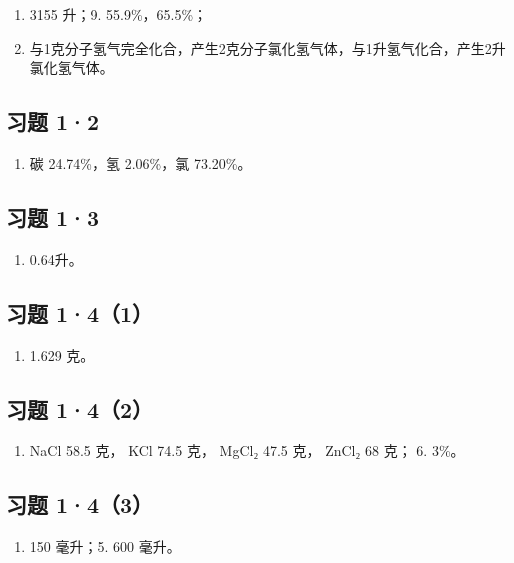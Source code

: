 \begin{enumerate}[start=8]
\item
  3155 升；9. 55.9\%，65.5\%；
\item
  与1克分子氢气完全化合，产生2克分子氯化氢气体，与1升氢气化合，产生2升氯化氢气体。
\end{enumerate}

\subsection{习题 1·2}

\begin{enumerate}[start=4]
\item
  碳 24.74\%，氢 2.06\%，氯 73.20\%。
\end{enumerate}

\subsection{习题 1·3}

\begin{enumerate}[start=4]
\item
  0.64升。
\end{enumerate}

\subsection{习题 1·4（1）}

\begin{enumerate}
\item
  1.629 克。
\end{enumerate}

\subsection{习题 1·4（2）}

\begin{enumerate}[start=4]
\item
  NaCl 58.5 克， KCl 74.5 克， MgCl₂ 47.5 克， ZnCl₂ 68 克； 6. 3\%。
\end{enumerate}

\subsection{习题 1·4（3）}

\begin{enumerate}[start=4]
\item
  150 毫升；5. 600 毫升。
\end{enumerate}


